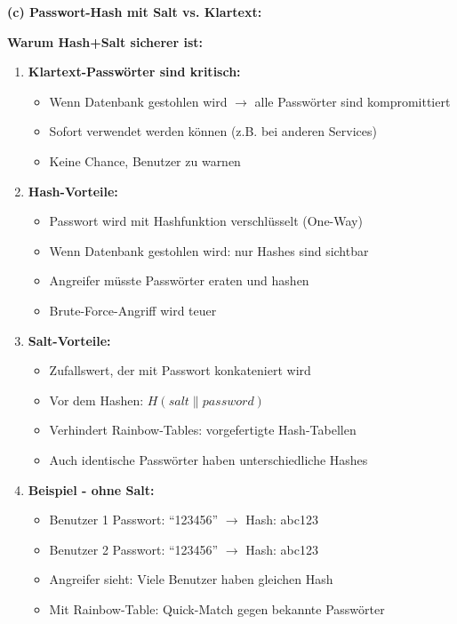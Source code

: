 \documentclass[12pt,a4paper]{article}
\begin{document}
\begin{tcolorbox}[colback=solutionbg, colframe=black!30]

\textbf{(c) Passwort-Hash mit Salt vs. Klartext:} \checkmark

\textbf{Warum Hash+Salt sicherer ist:}

\begin{enumerate}[1.]
    \item \textbf{Klartext-Passwörter sind kritisch:}
    \begin{itemize}
        \item Wenn Datenbank gestohlen wird $\to$ alle Passwörter sind kompromittiert
        \item Sofort verwendet werden können (z.B. bei anderen Services)
        \item Keine Chance, Benutzer zu warnen
    \end{itemize}
    
    \item \textbf{Hash-Vorteile:}
    \begin{itemize}
        \item Passwort wird mit Hashfunktion verschlüsselt (One-Way)
        \item Wenn Datenbank gestohlen wird: nur Hashes sind sichtbar
        \item Angreifer müsste Passwörter eraten und hashen
        \item Brute-Force-Angriff wird teuer
    \end{itemize}
    
    \item \textbf{Salt-Vorteile:}
    \begin{itemize}
        \item Zufallswert, der mit Passwort konkateniert wird
        \item Vor dem Hashen: $H(salt \| password)$
        \item Verhindert Rainbow-Tables: vorgefertigte Hash-Tabellen
        \item Auch identische Passwörter haben unterschiedliche Hashes
    \end{itemize}
    
    \item \textbf{Beispiel - ohne Salt:}
    \begin{itemize}
        \item Benutzer 1 Passwort: ``123456'' $\to$ Hash: abc123
        \item Benutzer 2 Passwort: ``123456'' $\to$ Hash: abc123
        \item Angreifer sieht: Viele Benutzer haben gleichen Hash
        \item Mit Rainbow-Table: Quick-Match gegen bekannte Passwörter
    \end{itemize}
    

\end{enumerate}
\end{tcolorbox}
\end{document}

